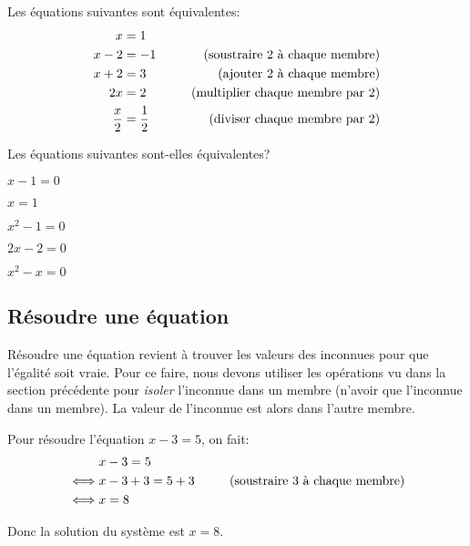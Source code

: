 \begin{exemple}
    Les équations suivantes sont équivalentes:
    \begin{alignat*}{3}
        x & = 1 &\\
        x - 2 & = -1& \text{  (soustraire 2 à chaque membre)}\\
        x + 2 & = 3& \text{ (ajouter 2 à chaque membre)}\\
        2x & = 2& \hspace{5mm}\text{ (multiplier chaque membre par 2)}\\
        \frac{x}2 & = \frac12& \text{ (diviser chaque membre par 2)}\\
    \end{alignat*}
\end{exemple}

\begin{exercice}
    Les équations suivantes sont-elles équivalentes?
    \begin{exerciceenumnoeq}
        \item $x - 1 = 0$
        \item $x = 1$
        \item $x^2 - 1 = 0$
        \item $2x - 2 = 0$
        \item $x^2 - x = 0$
    \end{exerciceenumnoeq}
\end{exercice}


\subsection{Résoudre une équation}

Résoudre une équation revient à trouver les valeurs des inconnues pour que l'égalité soit vraie. Pour ce faire, nous devons utiliser les opérations vu dans la section précédente pour \emph{isoler} l'inconnue dans un membre (n'avoir que l'inconnue dans un membre). La valeur de l'inconnue est alors dans l'autre membre.

\begin{exemple}
    Pour résoudre l'équation $x - 3 = 5$, on fait:
    \begin{alignat*}{3}
        & x - 3 = 5&\\
        \iff & x - 3 + 3 = 5 + 3 & \hspace{5mm} \text{ (soustraire 3 à chaque membre)}\\
        \iff & x = 8 &
    \end{alignat*}

    Donc la solution du système est $x = 8$.
\end{exemple}

